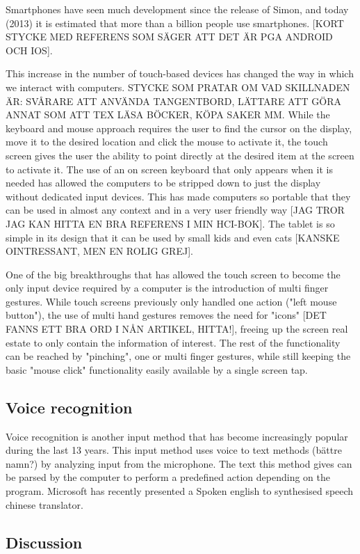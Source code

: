 Smartphones have seen much development since the release of Simon, and today (2013) it is estimated that more than a billion people use smartphones\cite{billion1}\cite{billion2}. [KORT STYCKE MED REFERENS SOM SÄGER ATT DET ÄR PGA ANDROID OCH IOS]. 

This increase in the number of touch-based devices has changed the way in which we interact with computers. STYCKE SOM PRATAR OM VAD SKILLNADEN ÄR: SVÅRARE ATT ANVÄNDA TANGENTBORD, LÄTTARE ATT GÖRA ANNAT SOM ATT TEX LÄSA BÖCKER, KÖPA SAKER MM.
While the keyboard and mouse approach requires the user to find the cursor on the display, move it to the desired location and click the mouse to activate it, the touch screen gives the user the ability to point directly at the desired item at the screen to activate it. The use of an on screen keyboard that only appears when it is needed has allowed the computers to be stripped down to just the display without dedicated input devices. This has made computers so portable that they can be used in almost any context and in a very user friendly way [JAG TROR JAG KAN HITTA EN BRA REFERENS I MIN HCI-BOK]. The tablet is so simple in its design that it can be used by small kids and even cats [KANSKE OINTRESSANT, MEN EN ROLIG GREJ].

One of the big breakthroughs that has allowed the touch screen to become the only input device required by a computer is the introduction of multi finger gestures. While touch screens previously only handled one action ("left mouse button"), the use of multi hand gestures removes the need for "icons" [DET FANNS ETT BRA ORD I NÅN ARTIKEL, HITTA!], freeing up the screen real estate to only contain the information of interest. The rest of the functionality can be reached by "pinching", one or multi finger gestures, while still keeping the basic "mouse click" functionality easily available by a single screen tap.

\subsection{Voice recognition}

Voice recognition is another input method that has become increasingly popular during the last 13 years. This input method uses voice to text methods (bättre namn?) by analyzing input from the microphone. The text this method gives can be parsed by the computer to perform a predefined action depending on the program. Microsoft has recently presented a Spoken english to synthesised speech chinese translator. 

\subsection{Discussion}

